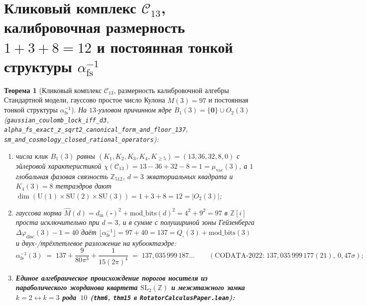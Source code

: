 \documentclass[11pt,a4paper]{article}
\theoremstyle{plain}
\newtheorem{theorem}{Теорема}[section]
\theoremstyle{definition}
\begin{document}
\section{Кликовый комплекс \texorpdfstring{$\mathcal{C}_{13}$}{C13}, калибровочная размерность \texorpdfstring{$1+3+8=12$}{1+3+8=12} и постоянная тонкой структуры \texorpdfstring{$\alpha_{\mathrm{fs}}^{-1}$}{alpha\_fs\^{}(-1)}}
\label{sec:sm-alpha}

\begin{theorem}[Кликовый комплекс $\mathcal{C}_{13}$, размерность калибровочной алгебры Стандартной модели, гауссово простое число Кулона $\hat{M}(3)=97$ и постоянная тонкой структуры $\alpha_{\mathrm{fs}}^{-1}$]
\label{thm:sm-alpha}
На $13$-узловом причинном ядре $B_1(3) = \{\mathbf{0}\}\cup O_2(3)$ (\texttt{gaussian\_coulomb\_lock\_iff\_d3}, \texttt{alpha\_fs\_exact\_z\_sqrt2\_canonical\_form\_and\_floor\_137}, \texttt{sm\_and\_cosmology\_closed\_rational\_operators}):
\begin{enumerate}[label=\textbf{(\roman*)},leftmargin=*]
\item числа клик $B_1(3)$ равны $(K_1,K_2,K_3,K_4,K_{\ge 5}) = (13, 36, 32, 8, 0)$ с эйлеровой характеристикой $\chi(\mathcal{C}_{13}) = 13 - 36 + 32 - 8 = 1 = \mu_{\mathrm{vac}}(3)$, а $1$ глобальная фазовая связность $\mathbb{Z}_{512}$, $d=3$ экваториальных квадрата и $K_4(3)=8$ тетраэдров дают $\dim(\mathrm{U}(1)\times\mathrm{SU}(2)\times\mathrm{SU}(3)) = 1 + 3 + 8 = 12 = |O_2(3)|$;
\item гауссова норма $\hat{M}(d) = d_{\mathrm{in}}(\square)^2 + \mathrm{mod\_bits}(d)^2 = 4^2 + 9^2 = 97$ в $\mathbb{Z}[i]$ проста исключительно при $d=3$, и в сумме с полушириной зоны Гейзенберга $\Delta\varphi_{\mathrm{disc}}(3)-1 = 40$ даёт $\lfloor\alpha_{\mathrm{fs}}^{-1}\rfloor = 97 + 40 = 137 = Q_\square(3) + \mathrm{mod\_bits}(3)$ и двух-/трёхпетлевое разложение на кубооктаэдре:
  \begin{equation}
    \label{eq:alpha-fs-137}
    \alpha_{\mathrm{fs}}^{-1}(3) \;=\; 137 + \frac{9}{80\pi^3} + \frac{1}{15(2\pi)^4} \;=\; 137{,}035\,999\,187\dots
    \qquad (\text{CODATA-2022: } 137{,}035\,999\,177(21),\ 0{,}47\sigma);
  \end{equation}
\item \textbf{Единое алгебраическое происхождение порогов носителя из параболического жорданова квартета $\mathrm{SL}_2(\mathbb{Z})$ и межэтажного замка $k=2 \leftrightarrow k=3$ рода~$10$ (\texttt{thm6}, \texttt{thm15} в \texttt{RotatorCalculusPaper.lean}):}

\end{enumerate}
\end{theorem}
\end{document}
